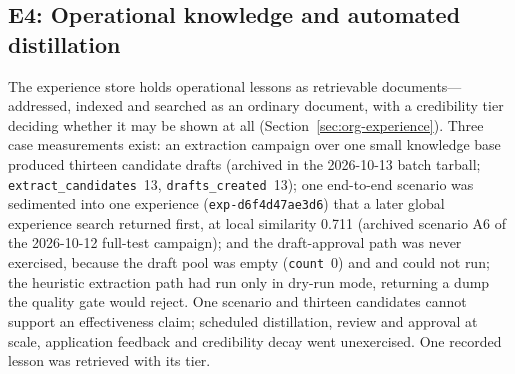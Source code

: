 \subsection{E4: Operational knowledge and automated distillation}
\label{sec:e3}

The experience store holds operational lessons as retrievable
documents---addressed, indexed and searched as an ordinary document, with a
credibility tier deciding whether it may be shown at all
(Section~\ref{sec:org-experience}). Three case measurements exist: an
extraction campaign over one small knowledge base produced thirteen
candidate drafts (archived  in the 2026-10-13
batch tarball; \texttt{extract\_candidates}~13, \texttt{drafts\_created}~13);
one end-to-end scenario was sedimented into one experience
(\texttt{exp-d6f4d47ae3d6}) that a later global experience search returned
first, at local similarity 0.711 (archived scenario A6 of the 2026-10-12
full-test campaign); and the draft-approval path was never exercised, because
the draft pool was empty (\texttt{count}~0) and 
and  could not run; the heuristic extraction
path had run only in dry-run mode, returning a dump the quality gate would
reject. One scenario and thirteen candidates cannot support an effectiveness
claim; scheduled distillation, review and approval at scale, application
feedback and credibility decay went unexercised. One recorded lesson was
retrieved with its tier.

